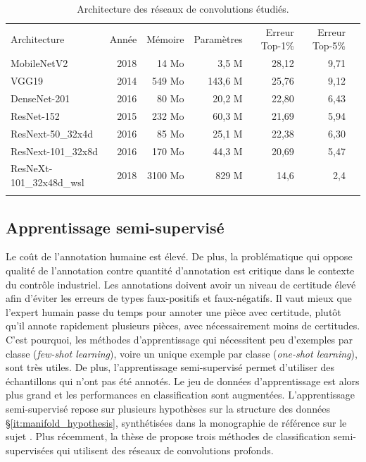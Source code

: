\begin{table}[hbtp]
    \centering
    \begin{tabular}{|l|r|r|r|r|r|r|}
        \hhline{------}
        Architecture             & Année & Mémoire & Paramètres & Erreur Top-1\% & Erreur Top-5\% \\
        \hhline{=:=:=:=:=:=} %
        MobileNetV2              & 2018  & 14 Mo   & 3,5 M      & 28,12          & 9,71           \\ \hline
        VGG19                    & 2014  & 549 Mo  & 143,6 M    & 25,76          & 9,12           \\ \hline
        DenseNet-201             & 2016  & 80 Mo   & 20,2 M     & 22,80          & 6,43           \\ \hline
        ResNet-152               & 2015  & 232 Mo  & 60,3 M     & 21,69          & 5,94           \\ \hline
        ResNext-50\_32x4d        & 2016  & 85 Mo   & 25,1 M     & 22,38          & 6,30           \\ \hline
        ResNext-101\_32x8d       & 2016  & 170 Mo  & 44,3 M     & 20,69          & 5,47          \\ \hline
        ResNeXt-101\_32x48d\_wsl & 2018  & 3100 Mo & 829 M      & 14,6           &     2,4           \\
        \hhline{------}
    \end{tabular}
    \caption{Architecture des réseaux de convolutions étudiés.}
    \label{tab:deep_models}
\end{table}

\subsection{Apprentissage semi-supervisé}
Le coût de l'annotation humaine est élevé.
De plus, la problématique qui oppose qualité de l'annotation contre quantité d'annotation est critique dans le contexte du contrôle industriel.
Les annotations doivent avoir un niveau de certitude élevé afin d'éviter les erreurs de types faux-positifs et faux-négatifs.
Il vaut mieux que l'expert humain passe du temps pour annoter une pièce avec certitude, plutôt qu'il annote rapidement plusieurs pièces, avec nécessairement moins de certitudes.
C'est pourquoi, les méthodes d'apprentissage qui nécessitent peu d'exemples par classe (\textit{few-shot learning}), voire un unique exemple par classe (\textit{one-shot learning}), sont très utiles.
De plus, l'apprentissage semi-supervisé permet d'utiliser des échantillons qui n'ont pas été annotés.
Le jeu de données d'apprentissage est alors plus grand et les performances en classification sont augmentées.
L'apprentissage semi-supervisé repose sur plusieurs hypothèses sur la structure des données §\ref{it:manifold_hypothesis}, synthétisées dans la monographie de référence sur le sujet  \cite{chapelle_semi-supervised_2010}.
Plus récemment, la thèse de \citeauthor{durand_weakly_2017} \cite{durand_weakly_2017} propose trois méthodes de classification semi-supervisées qui utilisent des réseaux de convolutions profonds.

